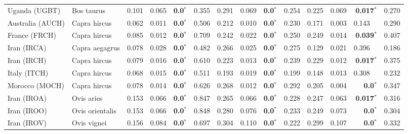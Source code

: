 \documentclass{article}
\begin{document}
\begin{table*}[!ht]
\begin{adjustbox}{width = 1\textwidth}
\begin{tabular}{||l|l||r|r|r|r||r|r|r|r||r|r|r|r||}
                Uganda (UGBT)                                       & Bos taurus          & 0.101 & 0.065   & \textbf{0.0}$\bm{^*}$   & 0.355 & 0.291  & 0.069  & \textbf{0.0}$\bm{^*}$ & 0.254 & 0.225 & 0.069 & \textbf{0.017}$\bm{^*}$ & 0.270 \\
                \rowcolor{LIGHTGREY} Australia (AUCH)               & Capra hircus        & 0.062 & 0.011   & \textbf{0.0}$\bm{^*}$   & 0.506 & 0.212  & 0.010  & \textbf{0.0}$\bm{^*}$ & 0.230 & 0.171 & 0.003 & 0.143~~ & 0.290 \\
                \rowcolor{LIGHTGREY} France (FRCH)                  & Capra hircus        & 0.085 & 0.012   & \textbf{0.0}$\bm{^*}$   & 0.709 & 0.242  & 0.022  & \textbf{0.0}$\bm{^*}$ & 0.250 & 0.249 & 0.014 & \textbf{0.039}$\bm{^*}$ & 0.407 \\
                \rowcolor{LIGHTGREY} Iran (IRCA)                    & Capra aegagrus      & 0.078 & 0.028   & \textbf{0.0}$\bm{^*}$   & 0.482 & 0.266  & 0.025  & \textbf{0.0}$\bm{^*}$ & 0.275 & 0.129 & 0.021 & 0.396~~ & 0.186 \\
                \rowcolor{LIGHTGREY} Iran (IRCH)                    & Capra hircus        & 0.079 & 0.016   & \textbf{0.0}$\bm{^*}$   & 0.610 & 0.223  & 0.013  & \textbf{0.0}$\bm{^*}$ & 0.239 & 0.229 & 0.012 & \textbf{0.017}$\bm{^*}$ & 0.375 \\
                \rowcolor{LIGHTGREY} Italy (ITCH)                   & Capra hircus        & 0.068 & 0.015   & \textbf{0.0}$\bm{^*}$   & 0.511 & 0.193  & 0.019  & \textbf{0.0}$\bm{^*}$ & 0.199 & 0.148 & 0.013 & 0.308~~ & 0.232 \\
                \rowcolor{LIGHTGREY} Morocco (MOCH)                 & Capra hircus        & 0.078 & 0.014   & \textbf{0.0}$\bm{^*}$   & 0.626 & 0.268  & 0.012 & \textbf{0.0}$\bm{^*}$ & 0.292 & 0.205 & 0.004 & \textbf{0.0}$\bm{^*}$ & 0.347 \\
                Iran (IROA)                                         & Ovis aries          & 0.153 & 0.066   & \textbf{0.0}$\bm{^*}$   & 0.847 & 0.265  & 0.066  & \textbf{0.0}$\bm{^*}$ & 0.228 & 0.247 & 0.063 & \textbf{0.017}$\bm{^*}$ & 0.316 \\
                Iran (IROO)                                         & Ovis orientalis     & 0.153 & 0.066   & \textbf{0.0}$\bm{^*}$   & 0.848 & 0.280  & 0.076  & \textbf{0.0}$\bm{^*}$ & 0.233 & 0.249 & 0.073 & \textbf{0.0}$\bm{^*}$ & 0.304 \\
                Iran (IROV)                                         & Ovis vignei         & 0.156 & 0.084   & \textbf{0.0}$\bm{^*}$   & 0.697 & 0.304  & 0.110  & \textbf{0.0}$\bm{^*}$ & 0.222 & 0.299 & 0.107 & \textbf{0.0}$\bm{^*}$ & 0.332 \\

\end{tabular}
\end{adjustbox}
\end{table*}
\end{document}
